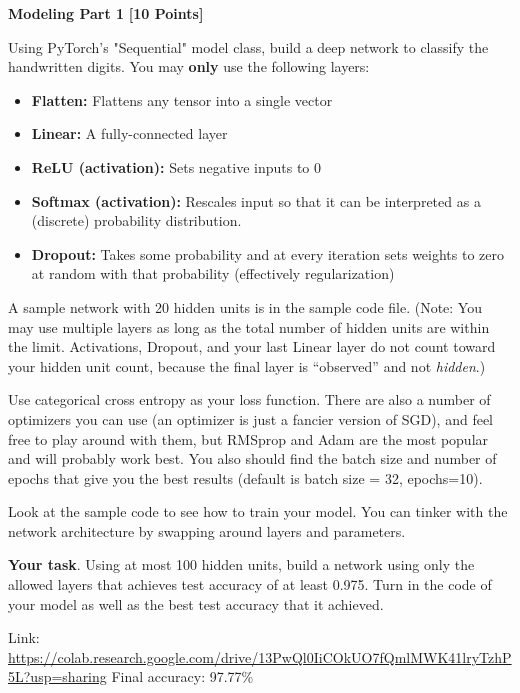  \problem \textbf{Modeling Part 1} \textbf{[10 Points]}

 Using PyTorch's "Sequential" model class, build a deep network to classify the handwritten digits. You may \textbf{only} use the following layers:

 \begin{itemize}
  \item \textbf{Flatten:} Flattens any tensor into a single vector
  \item \textbf{Linear:} A fully-connected layer
  \item \textbf{ReLU (activation):} Sets negative inputs to 0
  \item \textbf{Softmax (activation):} Rescales input so that it can be interpreted as a (discrete) probability distribution.
  \item \textbf{Dropout:} Takes some probability and at every iteration sets weights to zero at random with that probability (effectively regularization)
\end{itemize}

A sample network with 20 hidden units is in the sample code file. (Note: You may use multiple layers as long as the total number of hidden units are within the limit. Activations, Dropout, and your last Linear layer do not count toward your hidden unit count, because the final layer is ``observed'' and not \emph{hidden}.)

Use categorical cross entropy as your loss function. There are also a number of optimizers  you can use (an optimizer is just a fancier version of SGD), and feel free to play around with them, but RMSprop and Adam are the most popular and will probably work best. You also should find the batch size and number of epochs that give you the best results (default is batch size = 32, epochs=10).

Look at the sample code to see how to train your model. You can tinker with the network architecture by swapping around layers and parameters.

\textbf{Your task}. Using at most 100 hidden units, build a network using only the allowed layers that achieves test accuracy of at least 0.975. Turn in the code of your model as well as the best test accuracy that it achieved.



\begin{solution}
 Link: \url{https://colab.research.google.com/drive/13PwQl0IiCOkUO7fQmlMWK41lryTzhP5L?usp=sharing}
 Final accuracy: 97.77\%
\end{solution}


